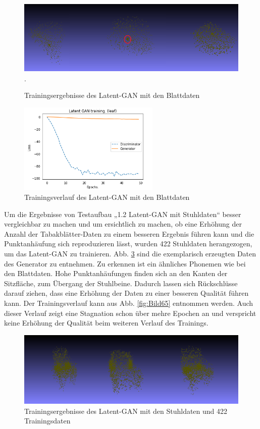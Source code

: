 \documentclass{llncs}
\begin{document}
\begin{figure}[htbp] 
	\centering
	\includegraphics[width=1.0\textwidth]{latent_gan_leaf_example.png}.
	\caption{Trainingsergebnisse des Latent-GAN mit den Blattdaten}
	\label{fig:Bild64}
\end{figure}
\begin{figure}[htbp] 
	\centering
	\includegraphics[width=0.6\textwidth]{Latent_gan_training_result.png}
	\caption{Trainingsverlauf des Latent-GAN mit den Blattdaten}
	\label{fig:Bild63}
\end{figure}
\pagebreak\linebreak 
Um die Ergebnisse von Testaufbau „1.2 Latent-GAN mit Stuhldaten“ besser vergleichbar zu machen und um ersichtlich zu machen, ob eine Erhöhung der Anzahl der Tabakblätter-Daten zu einem besseren Ergebnis führen kann und die Punktanhäufung sich reproduzieren lässt, wurden 422 Stuhldaten herangezogen, um das Latent-GAN zu trainieren.  Abb. \ref{fig:Bild66} sind die exemplarisch erzeugten Daten des Generator zu entnehmen. Zu erkennen ist ein ähnliches Phonemen wie bei den Blattdaten. Hohe Punktanhäufungen finden sich an den Kanten der Sitzfläche, zum Übergang der Stuhlbeine. Dadurch lassen sich Rückschlüsse darauf ziehen, dass eine Erhöhung der Daten zu einer besseren Qualität führen kann. Der Trainingsverlauf kann aus Abb. \ref{fig:Bild65} entnommen werden. Auch dieser Verlauf zeigt eine Stagnation schon über mehre Epochen an und verspricht keine Erhöhung der Qualität beim weiteren Verlauf des Trainings.
\begin{figure}[htbp] 
	\centering
	\includegraphics[width=1.0\textwidth]{raw_gan_latent_gan_chair_example_400.png}
	\caption{Trainingsergebnisse des Latent-GAN mit den Stuhldaten und 422 Trainingsdaten}
	\label{fig:Bild66}
\end{figure}
\end{document}
